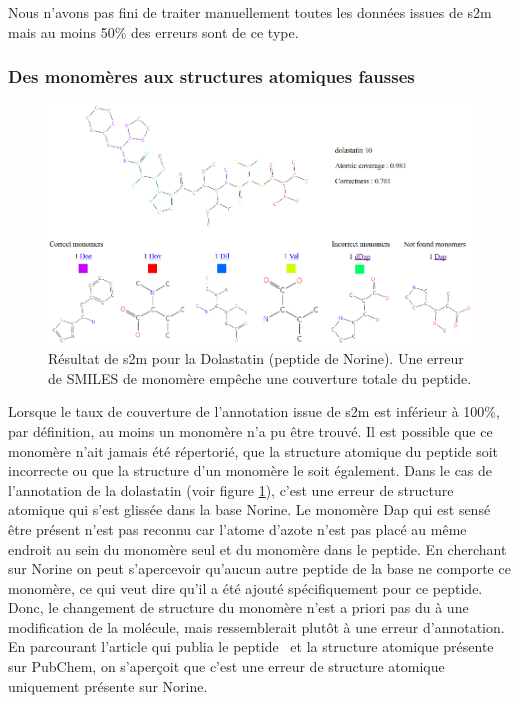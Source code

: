 Nous n'avons pas fini de traiter manuellement toutes les données issues de s2m mais au moins 50\% des erreurs sont de ce type.


\subsubsection{Des monomères aux structures atomiques fausses}

\label{dolastatin_p}

\begin{figure}[h!]
  \begin{center}
    \includegraphics[width=450px]{Figures/s2m/results/dolastatin.png}
    \caption{\label{dolas}Résultat de s2m pour la Dolastatin (peptide de Norine).
    Une erreur de SMILES de monomère empêche une couverture totale du peptide.}
  \end{center}
\end{figure}

Lorsque le taux de couverture de l'annotation issue de s2m est inférieur à 100\%, par définition, au moins un monomère n'a pu être trouvé.
Il est possible que ce monomère n'ait jamais été répertorié, que la structure atomique du peptide soit incorrecte ou que la structure d'un monomère le soit également.
Dans le cas de l'annotation de la dolastatin (voir figure \ref{dolas}), c'est une erreur de structure atomique qui s'est glissée dans la base Norine.
Le monomère Dap qui est sensé être présent n'est pas reconnu car l'atome d'azote n'est pas placé au même endroit au sein du monomère seul et du monomère dans le peptide.
En cherchant sur Norine on peut s'apercevoir qu'aucun autre peptide de la base ne comporte ce monomère, ce qui veut dire qu'il a été ajouté spécifiquement pour ce peptide.
Donc, le changement de structure du monomère n'est a priori pas du à une modification de la molécule, mais ressemblerait plutôt à une erreur d'annotation.
En parcourant l'article qui publia le peptide~\cite{luesch_isolation_2001} et la structure atomique présente sur PubChem, on s'aperçoit que c'est une erreur de structure atomique uniquement présente sur Norine.



